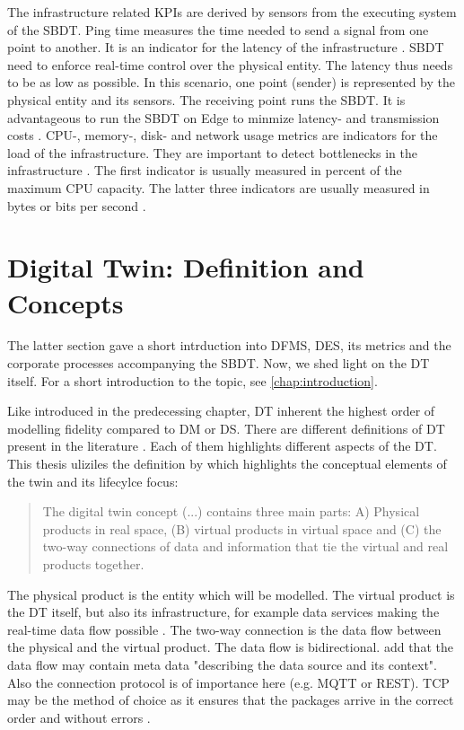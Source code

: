 The infrastructure related KPIs are derived by sensors from the executing system of the SBDT. Ping time measures the time needed to send a signal from one point to another. It is an indicator for the latency of the infrastructure \autocite{wu2021digital}. SBDT need to enforce real-time control over the physical entity. The latency thus needs to be as low as possible. In this scenario, one point (sender) is represented by the physical entity and its sensors. The receiving point runs the SBDT. It is advantageous to run the SBDT on Edge to minmize latency- and transmission costs \autocite{li2018learning}. CPU-, memory-, disk- and network usage metrics are indicators for the load of the infrastructure. They are important to detect bottlenecks in the infrastructure \autocite{li2018learning}. The first indicator is usually measured in percent of the maximum CPU capacity. The latter three indicators are usually measured in bytes or bits per second \autocite{granelli2021evaluating}.


\section{Digital Twin: Definition and Concepts}
\label{sec:digital-twin}
The latter section gave a short intrduction into DFMS, DES, its metrics and the corporate processes accompanying the SBDT. Now, we shed light on the DT itself. For a short introduction to the topic, see \autoref{chap:introduction}.

Like introduced in the predecessing chapter, DT inherent the highest order of modelling fidelity compared to DM or DS. There are different definitions of DT present in the literature \autocite{Negri2017promfg,zheng2019application,glaessgen2012digital,Demkovich2018def,boschert2016digital,grieves2014digital,kritzinger2018digital,Tao2018ijamt,zehnder2018representing}. Each of them highlights different aspects of the DT. This thesis uliziles the definition by \autocite{grieves2014digital} which highlights the conceptual elements of the twin and its lifecylce focus:

\begin{quote}
  The digital twin concept (...) contains three main parts: A) Physical products in real space, (B) virtual products in virtual space and (C) the two-way connections of data and information that tie the virtual and real products together. \autocite{grieves2014digital}
\end{quote}

The physical product is the entity which will be modelled. The virtual product is the DT itself, but also its infrastructure, for example data services making the real-time data flow possible \autocite{Tao2018ijamt}. The two-way connection is the data flow between the physical and the virtual product. The data flow is bidirectional. \citeauthor{zehnder2018representing} add that the data flow may contain meta data "describing the data source and its context". Also the connection protocol is of importance here (e.g. MQTT or REST). TCP may be the method of choice as it ensures that the packages arrive in the correct order and without errors \autocite{li2018learning}.

